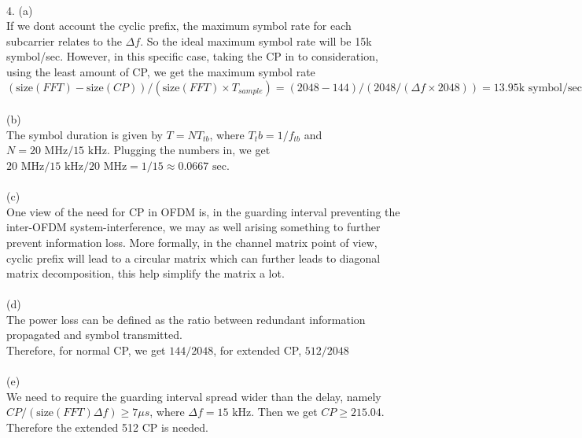 \documentclass [12pt] {article}
\begin{document}
\begin{spacing}{1.5}
~\\
4. (a)\\
If we dont account the cyclic prefix, the maximum symbol rate for each subcarrier relates to the $\Delta f$. So the ideal maximum symbol rate will be 15k symbol/sec. However, in this specific case, taking the CP in to consideration, using the least amount of CP, we get the maximum symbol rate $ (\text{size}(FFT) - \text{size}(CP))/(\text{size}(FFT)\times T_{sample}) = (2048 - 144)/(2048/(\Delta f \times 2048)) =  13.95 \text{k symbol/sec}$\\
~\\
(b)\\
The symbol duration is given by $T = N T_{tb}$, where $T_tb = 1/f_{tb} $ and $N = 20\text{ MHz} / 15\text{ kHz}$.
Plugging the numbers in, we get $ 20\text{ MHz} / 15\text{ kHz} / 20\text{ MHz} = 1/15 \approx 0.0667 \text{ sec}$.\\
~\\
(c)\\
One view of the need for CP in OFDM is, in the guarding interval preventing the inter-OFDM system-interference, we may as well arising something to further prevent information loss. More formally, in the channel matrix point of view, cyclic prefix will lead to a circular matrix which can further leads to diagonal matrix decomposition, this help simplify the matrix a lot. \\
~\\
(d) \\
The power loss can be defined as the ratio between redundant information propagated and symbol transmitted. \\
Therefore, for normal CP, we get $ 144/2048 $, for extended CP, $512/2048$\\
~\\
(e) \\
We need to require the guarding interval spread wider than the delay, namely $CP/(\text{size}(FFT)\Delta f) \geq 7\mu s$, where $\Delta f = 15\text{ kHz}$. Then we get $CP \geq 215.04$. Therefore the extended 512 CP is needed.\\
\end{spacing}
\end{document}
